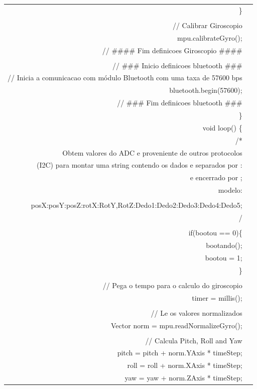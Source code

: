 \begin{longtable}{Rp{15cm}}
  \qquad \}\\
  \\
  \qquad // Calibrar Giroscopio\\
  \qquad mpu.calibrateGyro();\\
  \qquad // \#\#\#\# Fim definicoes Giroscopio \#\#\#\#\\
  \\
 \qquad // \#\#\# Inicio definicoes bluetooth \#\#\#  \\
  \qquad // Inicia a comunicacao com módulo Bluetooth com uma taxa de 57600 bps \\
  \qquad bluetooth.begin(57600); \\
  \qquad // \#\#\# Fim definicoes bluetooth \#\#\# \\
\}
\\
void loop() \{ \\
 \qquad  /* \\
 \qquad  * Obtem valores do ADC e proveniente de outros protocolos \\
 \qquad  * (I2C) para montar uma string contendo os dados e separados por : \\
 \qquad  * e encerrado por ; \\
 \qquad  * modelo: \\
 \qquad  *  \\
 \qquad  * posX:posY:posZ:rotX:RotY,RotZ:Dedo1:Dedo2:Dedo3:Dedo4:Dedo5; \\
 \qquad  */ \\
\\
 \qquad  if(bootou == 0)\{ \\
 \qquad \qquad     bootando(); \\
  \qquad \qquad     bootou = 1; \\
  \qquad \} \\
   \\
  \qquad // Pega o tempo para o calculo do giroscopio \\
  \qquad timer = millis(); \\
\\
\qquad // Le os valores normalizados \\
\qquad  Vector norm = mpu.readNormalizeGyro(); \\
\\
\qquad  // Calcula Pitch, Roll and Yaw \\
\qquad  pitch = pitch + norm.YAxis * timeStep; \\
\qquad  roll = roll + norm.XAxis * timeStep; \\
\qquad  yaw = yaw + norm.ZAxis * timeStep; \\

\end{longtable}
